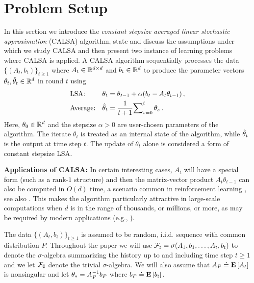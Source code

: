 \section{Problem Setup}\label{sec:prob}
In this section we introduce the \emph{constant stepsize averaged linear stochastic approximation} (CALSA) algorithm, state and discuss the assumptions under which we study CALSA and then present two instance of learning problems where CALSA is applied. A CALSA algorithm sequentially processes the data $\{(A_t,b_t)\}_{t\ge 1}$ 
where $A_t\in \mathbb{R}^{d \times d}$ and $b_t\in \mathbb{R}^d$ to produce the parameter vectors 
$\theta_t,\hat{\theta}_t\in \mathbb{R}^{d}$ in round $t$ using 
\begin{subequations}\label{eq:lsa}
\begin{align}
\label{conststep}&\text{LSA:} &\theta_t&=\theta_{t-1}+\alpha(b_t-A_t\theta_{t-1})\,,\\
\label{iteravg}&\text{Average:} &\hat{\theta}_t&=\frac{1}{t+1}{\sum}_{s=0}^{t}\,\theta_s\,.
\end{align}
\end{subequations}
Here, $\theta_0\in \mathbb{R}^d$ and the stepsize $\alpha>0$ are user-chosen parameters of the algorithm. 
The iterate $\theta_t$ is treated as an internal state of the algorithm, while $\hat{\theta}_t$ is the output at time step $t$. The update of $\theta_t$ alone is considered a form of constant stepsize LSA.

\textbf{Applications of CALSA:} In certain interesting cases, $A_t$ will have a special form (such as a rank-$1$ structure) and then the matrix-vector product $A_t \theta_{t-1}$ can also be computed in $O(d)$ time, a scenario common in reinforcement learning \cite{sutton,konda-tsitsiklis,gtd,gtd2,gtdmp}, see also . This makes the algorithm particularly attractive in large-scale computations when $d$ is in the range of thousands, or millions, or more, as may be required by modern applications (e.g., \citep{LiMaTaBo16}). 
\fi

The data $\{(A_t,b_t)\}_{t\ge 1}$ is assumed to be random, i.i.d. sequence with common distribution $P$. 
Throughout the paper we will use
$\mathcal{F}_t = \sigma(A_1,b_1,\dots,A_t,b_t)$ to denote the $\sigma$-algebra summarizing the history up to and
including time step $t\ge 1$ and we let $\mathcal{F}_0$ denote the trivial $\sigma$-algebra. We will also assume
that $A_P \doteq \mathbf{E}\left[A_t\right]$ is nonsingular and let $\theta_* = A_P^{-1} b_P$ where $b_P \doteq \mathbf{E}\left[b_t\right]$.

